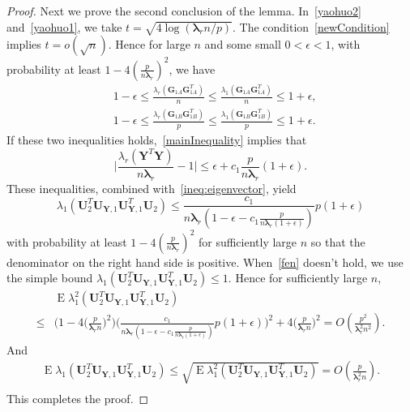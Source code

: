 \documentclass[12pt]{article} %
\DeclareMathOperator{\myE}{E}
\newcommand{\bY}{\mathbf{Y}}
\newcommand{\bG}{\mathbf{G}}
\newcommand{\bU}{\mathbf{U}}
\newcommand{\bfsym}[1]{\ensuremath{\boldsymbol{#1}}}
\def\blambda {\bfsym {\lambda}}
\theoremstyle{definition}
\begin{document}
\begin{appendices}
\begin{proof}
Next we prove the second conclusion of the lemma.
In~\eqref{yaohuo2} and~\eqref{yaohuo1}, we take $t=\sqrt{4\log(\blambda_r n/p)}$.
The condition~\eqref{newCondition} implies $t=o(\sqrt{n})$.
Hence for large $n$ and some small $0<\epsilon<1$, with probability at least $1-4(\frac{p}{ n\blambda_r})^2$, we have
$$
\begin{aligned}
    &1-\epsilon\leq \frac{\lambda_r(\bG_{1A}\bG_{1A}^T)}{n}\leq
\frac{\lambda_1(\bG_{1A}\bG_{1A}^T)}{n}\leq 1+\epsilon,\\
    &1-\epsilon\leq \frac{\lambda_r(\bG_{1B}\bG_{1B}^T)}{p}\leq
\frac{\lambda_1(\bG_{1B}\bG_{1B}^T)}{p}\leq 1+\epsilon.
\end{aligned}
$$
If these two inequalities holds,~\eqref{mainInequality} implies that
$$
\Big|\frac{\lambda_r(\bY^T \bY)}{n\blambda_r}-1\Big|
\leq 
\epsilon+c_1\frac{p}{n\blambda_r}(1+\epsilon).
$$
These inequalities, combined with~\eqref{ineq:eigenvector}, yield
\begin{equation}\label{fen}
\lambda_{1}(\bU_{2}^T \bU_{\bY,1} \bU_{\bY,1}^T \bU_{2})\leq
\frac{c_1}{n\blambda_r(1-\epsilon-c_1\frac{p}{n\blambda_r (1+\epsilon)})}p(1+\epsilon)
\end{equation}
with probability at least $1-4(\frac{p}{n\blambda_r})^2$ for sufficiently large $n$ so that the denominator on the right hand side is positive.
When~\eqref{fen} doesn't hold, we use the simple bound $\lambda_{1}(\bU_{2}^T \bU_{\bY,1} \bU_{\bY,1}^T \bU_{2})\leq 1$.
Hence for sufficiently large $n$,
$$
\begin{aligned}
    &\myE\lambda_{1}^2(\bU_{2}^T \bU_{\bY,1} \bU_{\bY,1}^T \bU_{2})\\
    \leq&
\Big(1-4\big(\frac{p}{\blambda_r n}\big)^2\Big)
\Big(\frac{c_1}{n\blambda_r(1-\epsilon-c_1\frac{p}{n\blambda_r (1+\epsilon)})}p(1+\epsilon)\Big)^2
+4\Big(\frac{p}{\blambda_r n}\Big)^2=O(\frac{p^2}{\blambda_r^2 n^2}).
\end{aligned}
$$
And
$$
\begin{aligned}
    \myE\lambda_{1}(\bU_{2}^T \bU_{\bY,1} \bU_{\bY,1}^T \bU_{2})
    \leq
    \sqrt{\myE\lambda_{1}^2(\bU_{2}^T \bU_{\bY,1} \bU_{\bY,1}^T \bU_{2})}=O(\frac{p}{\blambda_r^2 n}).\\
\end{aligned}
$$
This completes the proof.
\end{proof}


\end{appendices}
\end{document}
